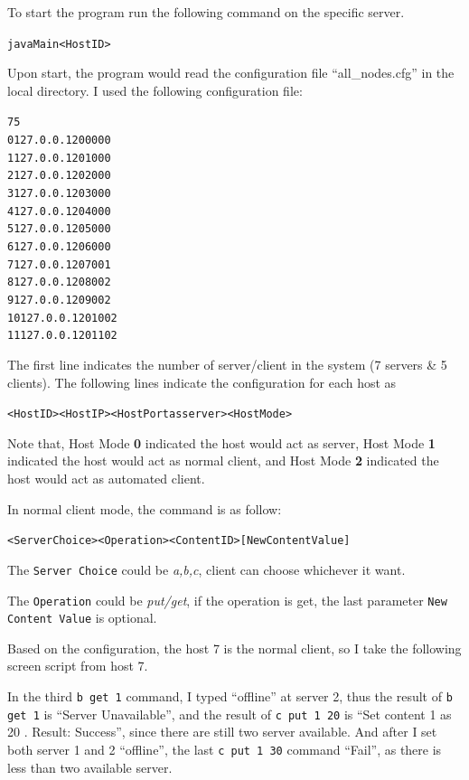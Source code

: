 \documentclass[11pt,letterpaper,en-US]{article}
\begin{document}
To start the program run the following command on the specific server.

\begin{alltt}
    java Main <Host ID>
\end{alltt}

Upon start, the program would read the configuration file ``all\_nodes.cfg'' in the local directory.
I used the following configuration file:
\begin{alltt}
    7 5
    0 127.0.0.1 20000 0
    1 127.0.0.1 20100 0
    2 127.0.0.1 20200 0
    3 127.0.0.1 20300 0
    4 127.0.0.1 20400 0
    5 127.0.0.1 20500 0
    6 127.0.0.1 20600 0
    7 127.0.0.1 20700 1
    8 127.0.0.1 20800 2
    9 127.0.0.1 20900 2
    10 127.0.0.1 20100 2
    11 127.0.0.1 20110 2
\end{alltt}

The first line indicates the number of server/client in the system (7 servers \& 5 clients).
The following lines indicate the configuration for each host as
\begin{alltt}
    <Host ID> <Host IP> <Host Port as server> <Host Mode>
\end{alltt}
Note that, Host Mode \textbf{0} indicated the host would act as server,
Host Mode \textbf{1} indicated the host would act as normal client,
and Host Mode \textbf{2} indicated the host would act as automated client.


In normal client mode, the command is as follow:
\begin{alltt}
    <Server Choice> <Operation> <Content ID> [New Content Value]
\end{alltt}

The \texttt{Server Choice} could be \emph{a,b,c}, client can choose whichever it want.

The \texttt{Operation} could be \emph{put/get}, if the operation is get, the last parameter
\texttt{New Content Value} is optional.

Based on the configuration, the host 7 is the normal client, so I take the following screen script from host 7.

In the third \texttt{b get 1} command, I typed ``offline'' at server 2, thus the result of \texttt{b get 1} is ``Server Unavailable'',
and the result of \texttt{c put 1 20} is ``Set content 1 as 20 . Result: Success'', since there are still two server available.
And after I set both server 1 and 2 ``offline'', the last \texttt{c put 1 30} command ``Fail'', as there is less than two available server.
\end{document}
